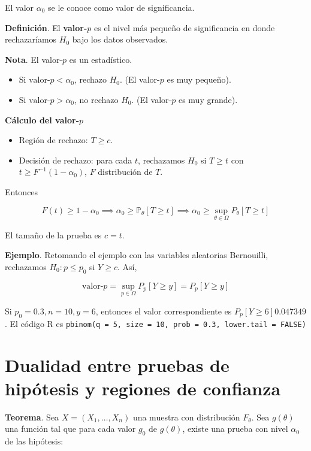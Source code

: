 \documentclass[
  12pt,
]{book}
\begin{document}
El valor \(\alpha_0\) se le conoce como valor de significancia.

\textbf{Definición}. El \textbf{valor-\(p\)} es el nivel más pequeño de significancia en
donde rechazaríamos \(H_0\) bajo los datos observados.

\textbf{Nota}. El valor-\(p\) es un estadístico.

\begin{itemize}
\item
  Si \(\text{valor-}p<\alpha_0\), rechazo \(H_0\). (El valor-\(p\) es muy pequeño).
\item
  Si \(\text{valor-}p>\alpha_0\), no rechazo \(H_0\). (El valor-\(p\) es muy grande).
\end{itemize}

\textbf{Cálculo del valor-\(p\)}

\begin{itemize}
\item
  Región de rechazo: \(T\geq c\).
\item
  Decisión de rechazo: para cada \(t\), rechazamos \(H_0\) si \(T\geq t\) con \(t\geq F^{-1}(1-\alpha_0)\), \(F\) distribución de \(T\).
\end{itemize}

Entonces

\[F(t) \geq 1-\alpha_0 \implies \alpha_0 \geq \mathbb P_\theta[T\geq t] \implies \alpha_0 \geq \sup_{\theta\in\Omega}P_{\theta}[T\geq t]\]

El tamaño de la prueba es \(c=t\).

\textbf{Ejemplo}. Retomando el ejemplo con las variables aleatorias Bernouilli,
rechazamos \(H_0: p\leq p_0\) si \(Y\geq c\). Así,

\[\text{valor-$p$} = \sup_{p\in\Omega}P_{p}[Y\geq y] =P_{p}[Y\geq y] \]

Si \(p_0 = 0.3, n=10, y =6\), entonces el valor correspondiente es \(P_{p}[Y\geq 6] 0.047349\). El código R es
\texttt{pbinom(q\ =\ 5,\ size\ =\ 10,\ prob\ =\ 0.3,\ lower.tail\ =\ FALSE)}

\hypertarget{dualidad-entre-pruebas-de-hipuxf3tesis-y-regiones-de-confianza}{%
\section{Dualidad entre pruebas de hipótesis y regiones de confianza}\label{dualidad-entre-pruebas-de-hipuxf3tesis-y-regiones-de-confianza}}

\textbf{Teorema}. Sea \(X = (X_1,\dots,X_n)\) una muestra con distribución \(F_\theta\).
Sea \(g(\theta)\) una función tal que para cada valor \(g_0\) de \(g(\theta)\), existe
una prueba con nivel \(\alpha_0\) de las hipótesis:
\end{document}
